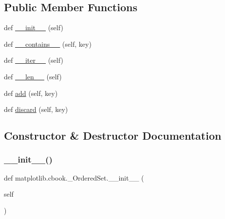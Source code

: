 \subsection*{Public Member Functions}
\begin{DoxyCompactItemize}
\item 
def \hyperlink{classmatplotlib_1_1cbook_1_1__OrderedSet_abb4a1794c1f32df3314da469024ec870}{\+\_\+\+\_\+init\+\_\+\+\_\+} (self)
\item 
def \hyperlink{classmatplotlib_1_1cbook_1_1__OrderedSet_a17404c7296ef7b893573075c30e6558d}{\+\_\+\+\_\+contains\+\_\+\+\_\+} (self, key)
\item 
def \hyperlink{classmatplotlib_1_1cbook_1_1__OrderedSet_aee873ac7ae99dee7c989db2f3e4a80fd}{\+\_\+\+\_\+iter\+\_\+\+\_\+} (self)
\item 
def \hyperlink{classmatplotlib_1_1cbook_1_1__OrderedSet_a48be574497527f46a7cb24c53172636e}{\+\_\+\+\_\+len\+\_\+\+\_\+} (self)
\item 
def \hyperlink{classmatplotlib_1_1cbook_1_1__OrderedSet_a56053fed44f77b8b5632de663cd9c3f8}{add} (self, key)
\item 
def \hyperlink{classmatplotlib_1_1cbook_1_1__OrderedSet_a82003fe3ca74201b5ea4b8d7ecd426fd}{discard} (self, key)
\end{DoxyCompactItemize}


\subsection{Constructor \& Destructor Documentation}
\mbox{\label{classmatplotlib_1_1cbook_1_1__OrderedSet_abb4a1794c1f32df3314da469024ec870}} 
\subsubsection{\texorpdfstring{\+\_\+\+\_\+init\+\_\+\+\_\+()}{\_\_init\_\_()}}
{\footnotesize\ttfamily def matplotlib.\+cbook.\+\_\+\+Ordered\+Set.\+\_\+\+\_\+init\+\_\+\+\_\+ (\begin{DoxyParamCaption}\item[{}]{self }\end{DoxyParamCaption})}



